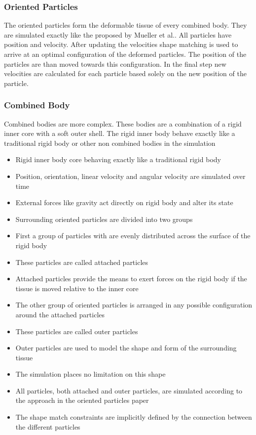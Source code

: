\subsubsection{Oriented Particles}

The oriented particles form the deformable tissue of every combined body. They are simulated exactly like the proposed by Mueller et al.. All particles have position and velocity. After updating the velocities shape matching is used to arrive at an optimal configuration of the deformed particles. The position of the particles are than moved towards this configuration. In the final step new velocities are calculated for each particle based solely on the new position of the particle.

\subsubsection{Combined Body}
Combined bodies are more complex. These bodies are a combination of a rigid inner core with a soft outer shell. The rigid inner body behave exactly like a traditional rigid body or other non combined bodies in the simulation

\begin{itemize}
\item Rigid inner body core behaving exactly like a traditional rigid body
\item Position, orientation, linear velocity and angular velocity are simulated over time
\item External forces like gravity act directly on rigid body and alter its state
\item Surrounding oriented particles are divided into two groups
\item First a group of particles with are evenly distributed across the surface of the rigid body
\item These particles are called attached particles
\item Attached particles provide the means to exert forces on the rigid body if the tissue is moved relative to the inner core
\item The other group of oriented particles is arranged in any possible configuration around the attached particles
\item These particles are called outer particles
\item Outer particles are used to model the shape and form of the surrounding tissue
\item The simulation places no limitation on this shape
\item All particles, both attached and outer particles, are simulated according to the approach in the oriented particles paper
\item The shape match constraints are implicitly defined by the connection between the different particles 
\end{itemize}

